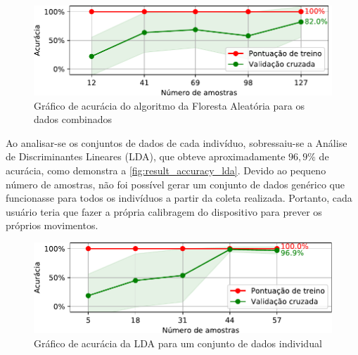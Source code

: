 \begin{figure}[ht]
	\caption{\label{fig:result_accuracy_rfc}Gráfico de acurácia do algoritmo da Floresta Aleatória para os dados combinados}
	\begin{center}
	    \includegraphics[width=\textwidth]{resources/result_accuracy_rfc}
	\end{center}
\end{figure}

Ao analisar-se os conjuntos de dados de cada indivíduo, sobressaiu-se a Análise de Discriminantes Lineares (LDA), que obteve aproximadamente \(96{,}9\%\) de acurácia, como demonstra a \autoref{fig:result_accuracy_lda}. Devido ao pequeno número de amostras, não foi possível gerar um conjunto de dados genérico que funcionasse para todos os indivíduos a partir da coleta realizada. Portanto, cada usuário teria que fazer a própria calibragem do dispositivo para prever os próprios movimentos.

\begin{figure}[ht]
	\caption{\label{fig:result_accuracy_lda}Gráfico de acurácia da LDA para um conjunto de dados individual}
	\begin{center}
	    \includegraphics[width=\textwidth]{resources/result_accuracy_lda}
	\end{center}
\end{figure}



